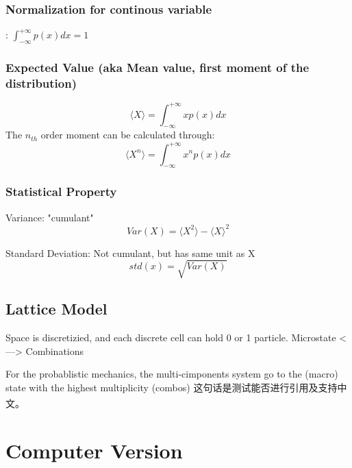 \documentclass[a4paper]{article}
\newcommand{\upcite}[1]{\textsuperscript{\cite{#1}}}
\begin{document}
\subsubsection{Normalization for continous variable}:
$\int_{-\infty}^{+\infty} p(x)dx = 1$
\subsubsection{Expected Value (aka Mean value, first moment of the distribution)}
\begin{equation}
	\langle X \rangle=\int_{-\infty}^{+\infty}xp(x)dx
\end{equation}
The $n_{th}$ order moment can be calculated through:
\begin{equation}
	\langle X^{n} \rangle = \int_{-\infty}^{+\infty}x^{n}p(x) dx
\end{equation}

\subsubsection{Statistical Property}
Variance: "cumulant"
\begin{equation}
	Var(X)=\langle X^{2} \rangle - {\langle X \rangle}^{2}
\end{equation}

Standard Deviation: Not cumulant, but has same unit as X
\begin{equation}
	std(x)=\sqrt{Var(X)}
\end{equation}

\subsection{Lattice Model}
Space is discretizied, and each discrete cell can hold 0 or 1 particle.
Microstate <---> Combinations

For the probablistic mechanics, the multi-cimponents system go to the (macro) state with the highest multiplicity (combos)
这句话是测试能否进行引用及支持中文\upcite{1}。

\section{Computer Version}
\end{document}
